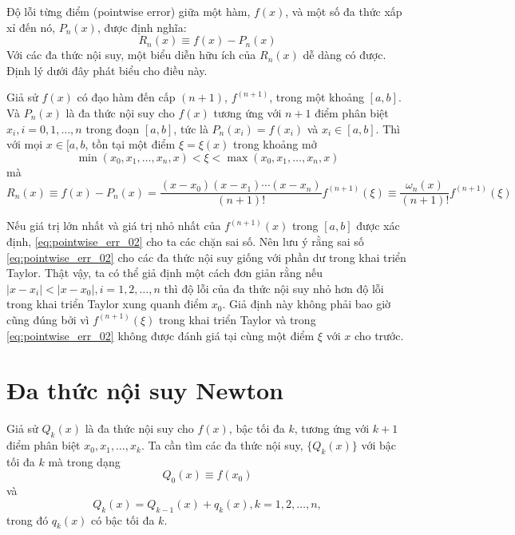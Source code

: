 Độ lỗi từng điểm (pointwise error) giữa một hàm, $f(x)$, và một số đa thức xấp xỉ đến nó, $P_n(x)$, được định nghĩa:
\begin{equation}
    R_n(x) \equiv f(x) - P_n(x)
\end{equation}
Với các đa thức nội suy, một biểu diễn hữu ích của $R_n(x)$ dễ dàng có được. Định lý dưới đây phát biểu cho điều này.
\begin{theorem}
    \label{theorem:pointwise_err}
    Giả sử $f(x)$ có đạo hàm đến cấp $(n+1)$, $f^{(n+1)}$, trong một khoảng $[a, b]$. Và $P_n(x)$ là đa thức nội suy cho $f(x)$ tương ứng với $n+1$ điểm phân biệt $x_i, i = 0, 1, \dots, n$ trong đoạn $[a, b]$, tức là $P_n(x_i) = f(x_i)$ và $x_i \in [a, b]$. Thì với mọi $x \in [a, b$, tồn tại một điểm $\xi = \xi(x)$ trong khoảng mở
    \begin{equation}
        \label{eq:pointwise_err_01}
        \min(x_0, x_1, \dots, x_n, x) < \xi < \max(x_0, x_1, \dots, x_n, x)
    \end{equation}
    mà
    \begin{equation}
        \label{eq:pointwise_err_02}
        R_n(x) \equiv f(x) - P_n(x) = \frac{(x-x_0)(x-x_1)\cdots(x-x_n)}{(n+1)!}f^{(n+1)}(\xi) \equiv \frac{\omega_n(x)}{(n+1)!}f^{(n+1)}(\xi)
    \end{equation}
\end{theorem}
Nếu giá trị lớn nhất và giá trị nhỏ nhất của $f^{(n+1)}(x)$ trong $[a, b]$ được xác định, \eqref{eq:pointwise_err_02} cho ta các chặn sai số. Nên lưu ý rằng sai số \eqref{eq:pointwise_err_02} cho các đa thức nội suy giống với phần dư trong khai triển Taylor. Thật vậy, ta có thể giả định một cách đơn giản rằng nếu $\left |  x - x_i\right | < \left |  x - x_0\right |, i = 1, 2, \dots, n$ thì độ lỗi của đa thức nội suy nhỏ hơn độ lỗi trong khai triển Taylor xung quanh điểm $x_0$. Giả định này không phải bao giờ cũng đúng bởi vì $f^{(n+1)}(\xi)$ trong khai triển Taylor và trong \eqref{eq:pointwise_err_02} không được đánh giá tại cùng một điểm $\xi$ với $x$ cho trước.

\section{Đa thức nội suy Newton}

Giả sử $Q_k(x)$ là đa thức nội suy cho $f(x)$, bậc tối đa $k$, tương ứng với $k+1$ điểm phân biệt $x_0, x_1, \dots, x_{k}$. Ta cần tìm các đa thức nội suy, $\{Q_k(x)\}$ với bậc tối đa $k$ mà trong dạng
\begin{equation}
    Q_0(x) \equiv f(x_0)
\end{equation}
và
\begin{equation}
    \label{eq:newton_interpolation_recur}
    Q_k(x) = Q_{k-1}(x) + q_k(x), k = 1, 2, \dots, n,
\end{equation}
trong đó $q_k(x)$ có bậc tối đa $k$.

